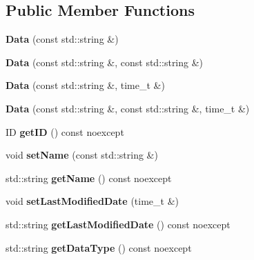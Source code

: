 \subsection*{Public Member Functions}
\begin{DoxyCompactItemize}
\item 
\mbox{\label{classdb_1_1_data_aed9c8c04f9a4d0faff36bf7880010686}} 
{\bfseries Data} (const std\+::string \&)
\item 
\mbox{\label{classdb_1_1_data_a79e2dc2dbadf4e565f0682a4491724e1}} 
{\bfseries Data} (const std\+::string \&, const std\+::string \&)
\item 
\mbox{\label{classdb_1_1_data_aeeb913b15ef81696197b928b98de1307}} 
{\bfseries Data} (const std\+::string \&, time\+\_\+t \&)
\item 
\mbox{\label{classdb_1_1_data_a676b310b984dcb633ae9720db9618aa0}} 
{\bfseries Data} (const std\+::string \&, const std\+::string \&, time\+\_\+t \&)
\item 
\mbox{\label{classdb_1_1_data_ab3063ac3785e2b29981acad42435ede3}} 
ID {\bfseries get\+ID} () const noexcept
\item 
\mbox{\label{classdb_1_1_data_a118b5ac931e3b5a75bcd98093b353f54}} 
void {\bfseries set\+Name} (const std\+::string \&)
\item 
\mbox{\label{classdb_1_1_data_a31d6a0de02133523356aa028906a4ce7}} 
std\+::string {\bfseries get\+Name} () const noexcept
\item 
\mbox{\label{classdb_1_1_data_a29361c7204a9f1436b1e8377ae0a382c}} 
void {\bfseries set\+Last\+Modified\+Date} (time\+\_\+t \&)
\item 
\mbox{\label{classdb_1_1_data_aeb95802d14ad955df8aaf64ac306ce86}} 
std\+::string {\bfseries get\+Last\+Modified\+Date} () const noexcept
\item 
\mbox{\label{classdb_1_1_data_af5fabf850329d0b2e6f34848e74d4c6c}} 
std\+::string {\bfseries get\+Data\+Type} () const noexcept

\end{DoxyCompactItemize}
